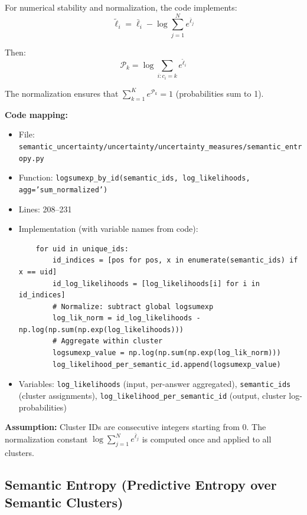 \documentclass{article}
\begin{document}
For numerical stability and normalization, the code implements:
\begin{equation}
\tilde{\ell}_i = \bar{\ell}_i - \log \sum_{j=1}^{N} e^{\bar{\ell}_j}
\label{eq:normalize_logprobs}
\end{equation}

Then:
\begin{equation}
\mathcal{P}_k = \log \sum_{i : c_i = k} e^{\tilde{\ell}_i}
\label{eq:logsumexp_normalized}
\end{equation}

The normalization ensures that $\sum_{k=1}^{K} e^{\mathcal{P}_k} = 1$ (probabilities sum to 1).

\textbf{Code mapping:}
\begin{itemize}
    \item File: \texttt{semantic\_uncertainty/uncertainty/uncertainty\_measures/semantic\_entropy.py}
    \item Function: \texttt{logsumexp\_by\_id(semantic\_ids, log\_likelihoods, agg='sum\_normalized')}
    \item Lines: 208--231
    \item Implementation (with variable names from code):
    \begin{verbatim}
    for uid in unique_ids:
        id_indices = [pos for pos, x in enumerate(semantic_ids) if x == uid]
        id_log_likelihoods = [log_likelihoods[i] for i in id_indices]
        # Normalize: subtract global logsumexp
        log_lik_norm = id_log_likelihoods - np.log(np.sum(np.exp(log_likelihoods)))
        # Aggregate within cluster
        logsumexp_value = np.log(np.sum(np.exp(log_lik_norm)))
        log_likelihood_per_semantic_id.append(logsumexp_value)
    \end{verbatim}
    \item Variables: \texttt{log\_likelihoods} (input, per-answer aggregated), \texttt{semantic\_ids} (cluster assignments), \texttt{log\_likelihood\_per\_semantic\_id} (output, cluster log-probabilities)
\end{itemize}

\textbf{Assumption:} Cluster IDs are consecutive integers starting from 0. The normalization constant $\log \sum_{j=1}^{N} e^{\bar{\ell}_j}$ is computed once and applied to all clusters.

\subsection{Semantic Entropy (Predictive Entropy over Semantic Clusters)}
\end{document}
